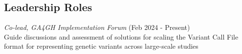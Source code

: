 \documentclass[margin,line]{res}
\begin{document}
\begin{resume}



\section{\sc Leadership Roles}
{\em Co-lead, GA4GH Implementation Forum} (Feb 2024 - Present)\\
Guide discussions and assessment of solutions for scaling the Variant Call File format for representing genetic variants across large-scale studies


\end{resume}
\end{document}
